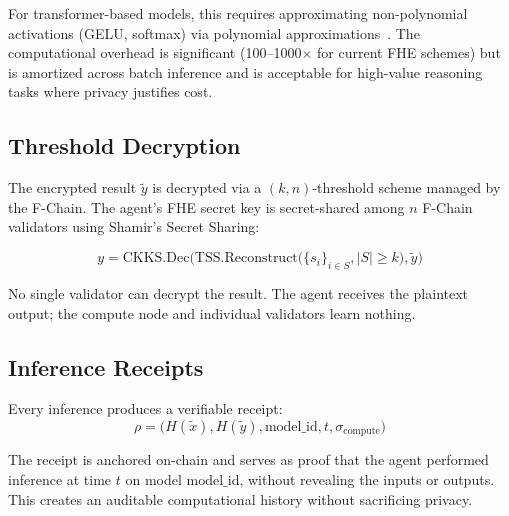 For transformer-based models, this requires approximating non-polynomial activations (GELU, softmax) via polynomial approximations~\cite{lee2022privacy}. The computational overhead is significant (100--1000$\times$ for current FHE schemes) but is amortized across batch inference and is acceptable for high-value reasoning tasks where privacy justifies cost.

\subsection{Threshold Decryption}

The encrypted result $\tilde{y}$ is decrypted via a $(k, n)$-threshold scheme managed by the F-Chain. The agent's FHE secret key is secret-shared among $n$ F-Chain validators using Shamir's Secret Sharing:

\begin{equation}\label{eq:threshold-dec}
    y = \text{CKKS.Dec}\Big(\text{TSS.Reconstruct}\big(\{s_i\}_{i \in S}, |S| \geq k\big), \tilde{y}\Big)
\end{equation}

No single validator can decrypt the result. The agent receives the plaintext output; the compute node and individual validators learn nothing.

\subsection{Inference Receipts}

Every inference produces a verifiable receipt:
\begin{equation}\label{eq:receipt}
    \rho = \big(H(\tilde{x}), H(\tilde{y}), \text{model\_id}, t, \sigma_{\text{compute}}\big)
\end{equation}

The receipt is anchored on-chain and serves as proof that the agent performed inference at time $t$ on model $\text{model\_id}$, without revealing the inputs or outputs. This creates an auditable computational history without sacrificing privacy.

